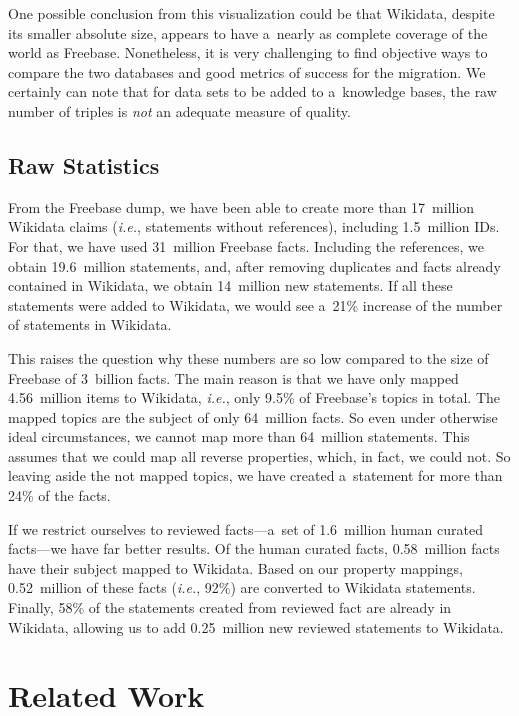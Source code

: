 \documentclass{sig-alternate-2013}
\begin{document}
One possible conclusion from this visualization could be that Wikidata,
despite its smaller absolute size, appears to have
a~nearly as complete coverage of the world as Freebase.
Nonetheless, it is very challenging to find objective ways to compare the two databases
and good metrics of success for the migration.
We certainly can note that for data sets to be added to a~knowledge bases,
the raw number of triples is \emph{not} an adequate measure of quality.

\subsection{Raw Statistics}

From the Freebase dump, we have been able to create more than 17~million Wikidata claims
(\emph{i.e.}, statements without references), including 1.5~million IDs.
For that, we have used 31~million Freebase facts.
Including the references, we obtain 19.6~million statements, and, after removing duplicates
and facts already contained in Wikidata, we obtain 14~million new statements.
If all these statements were added to Wikidata,
we would see a~21\% increase of the number of statements in Wikidata.

This raises the question why these numbers are so low compared to the size of Freebase of 3~billion facts.
The main reason is that we have only mapped 4.56~million items to Wikidata,
\emph{i.e.}, only 9.5\% of Freebase's topics in total.
The mapped topics are the subject of only 64~million facts.
So even under otherwise ideal circumstances, we cannot map more than 64~million statements.
This assumes that we could map all reverse properties, which, in fact, we could not.
So leaving aside the not mapped topics, we have created a~statement for more than 24\% of the facts.

If we restrict ourselves to reviewed facts---a~set of
1.6~million human curated facts---we have far better results.
Of the human curated facts, 0.58~million facts have their subject mapped to Wikidata.
Based on our property mappings, 0.52~million of these facts
(\emph{i.e.}, 92\%) are converted to Wikidata statements.
Finally, 58\% of the statements created from reviewed fact are already in Wikidata,
allowing us to add 0.25~million new reviewed statements to Wikidata.

\section{Related Work}\label{sec:related-work}
\end{document}
